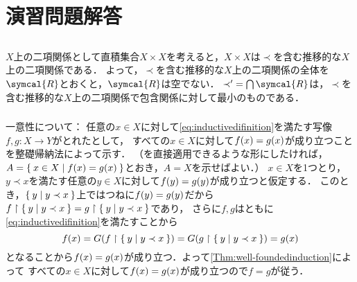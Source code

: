 \chapter{演習問題解答} \label{chap:answer}

\section*{}

\subsection*{}

\(X\)上の二項関係として直積集合\(X \times X\)を考えると，\(X \times X\)は\(\prec\)を含む推移的な\(X\)上の二項関係である．
よって，\(\prec\)を含む推移的な\(X\)上の二項関係の全体を\(\symcal{R}\)とおくと，\(\symcal{R}\)は空でない．
\(\mathord{\prec'} = \bigcap \symcal{R}\)は，\(\prec\)を含む推移的な\(X\)上の二項関係で包含関係に対して最小のものである．

\subsection*{}

一意性について：
任意の\(x \in X\)に対して\cref{eq:inductivedifinition}を満たす写像\(f, g \colon X \to Y\)がとれたとして，
すべての\(x \in X\)に対して\(\apply{f}{x} = \apply{g}{x}\)が成り立つことを整礎帰納法によって示す．
（を直接適用できるような形にしたければ，
\(A = \Set{x \in X | \apply{f}{x} = \apply{g}{x}}\)とおき，\(A = X\)を示せばよい．）
\(x \in X\)を1つとり，\(y \prec x\)を満たす任意の\(y \in X\)に対して\(\apply{f}{y} = \apply{g}{y}\)が成り立つと仮定する．
このとき，\(\Set{y | y \prec x}\)上ではつねに\(\apply{f}{y} = \apply{g}{y}\)だから
\(f \upharpoonright \Set{y | y \prec x} = g \upharpoonright \Set{y | y \prec x}\)であり，
さらに\(f,g\)はともに\cref{eq:inductivedifinition}を満たすことから
\[
	\apply{f}{x} = \apply{G}{f \restriction \Set{y | y \prec x}} = \apply{G}{ g \restriction \Set{y | y \prec x}} = \apply{g}{x}
\]
となることから\(\apply{f}{x} = \apply{g}{x}\)が成り立つ．よって\cref{Thm:well-foundedinduction}によって
すべての\(x \in X\)に対して\(\apply{f}{x} = \apply{g}{x}\)が成り立つので\(f = g\)が従う．

